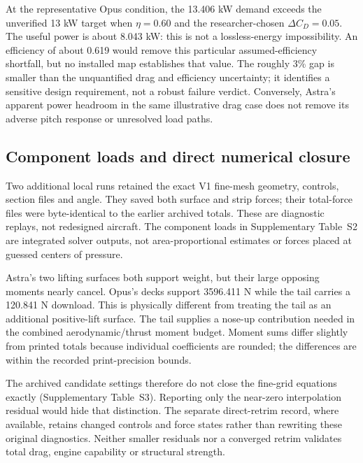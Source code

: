 \documentclass[11pt,a4paper]{article}
\begin{document}
At the representative Opus condition, the 13.406 kW demand exceeds the unverified 13 kW target when $\eta=0.60$ and the researcher-chosen $\Delta C_D=0.05$. The useful power is about 8.043 kW: this is not a lossless-energy impossibility. An efficiency of about 0.619 would remove this particular assumed-efficiency shortfall, but no installed map establishes that value. The roughly 3\% gap is smaller than the unquantified drag and efficiency uncertainty; it identifies a sensitive design requirement, not a robust failure verdict. Conversely, Astra's apparent power headroom in the same illustrative drag case does not remove its adverse pitch response or unresolved load paths.

\subsection{Component loads and direct numerical closure}
Two additional local runs retained the exact V1 fine-mesh geometry, controls, section files and angle. They saved both surface and strip forces; their total-force files were byte-identical to the earlier archived totals. These are diagnostic replays, not redesigned aircraft. The component loads in Supplementary Table~S2 are integrated solver outputs, not area-proportional estimates or forces placed at guessed centers of pressure.



Astra's two lifting surfaces both support weight, but their large opposing moments nearly cancel. Opus's decks support 3596.411 N while the tail carries a 120.841 N download. This is physically different from treating the tail as an additional positive-lift surface. The tail supplies a nose-up contribution needed in the combined aerodynamic/thrust moment budget. Moment sums differ slightly from printed totals because individual coefficients are rounded; the differences are within the recorded print-precision bounds.



The archived candidate settings therefore do not close the fine-grid equations exactly (Supplementary Table~S3). Reporting only the near-zero interpolation residual would hide that distinction. The separate direct-retrim record, where available, retains changed controls and force states rather than rewriting these original diagnostics. Neither smaller residuals nor a converged retrim validates total drag, engine capability or structural strength.
\end{document}
